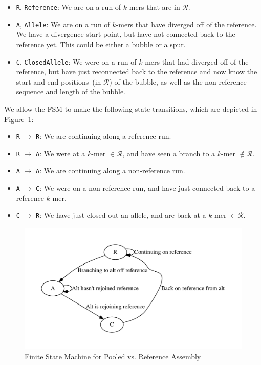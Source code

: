 \documentclass[masters]{ucbthesis}
\begin{document}
\begin{itemize}
\item \texttt{R}, \texttt{Reference}: We are on a run of $k$-mers that are in $\mathcal{R}$.
\item \texttt{A}, \texttt{Allele}: We are on a run of $k$-mers that have diverged off of the reference. We
have a divergence start point, but have not connected back to the reference yet. This could be either
a bubble or a spur. 
\item \texttt{C}, \texttt{ClosedAllele}: We were on a run of $k$-mers that had diverged off of the reference,
but have just reconnected back to the reference and now know the start and end positions~(in
$\mathcal{R}$) of the bubble, as well as the non-reference sequence and length of the bubble.
\end{itemize}

We allow the FSM to make the following state transitions, which are depicted in Figure~\ref{fig:fsm}:

\begin{itemize}
\item \texttt{R} $\rightarrow$ \texttt{R}: We are continuing along a reference run.
\item \texttt{R} $\rightarrow$ \texttt{A}: We were at a $k$-mer $\in \mathcal{R}$, and have seen a branch
to a $k$-mer $\not\in \mathcal{R}$.
\item \texttt{A} $\rightarrow$ \texttt{A}: We are continuing along a non-reference run.
\item \texttt{A} $\rightarrow$ \texttt{C}: We were on a non-reference run, and have just connected back to
a reference $k$-mer.
\item \texttt{C} $\rightarrow$ \texttt{R}: We have just closed out an allele, and are back at a $k$-mer
$\in \mathcal{R}$.
\end{itemize}

\begin{figure}[h]
\begin{center}
\includegraphics[width=0.5\linewidth, clip=true, trim=0 39 0 39]{graphs/fsm.pdf}
\end{center}
\caption{Finite State Machine for Pooled vs. Reference Assembly}
\label{fig:fsm}
\end{figure}
\end{document}
